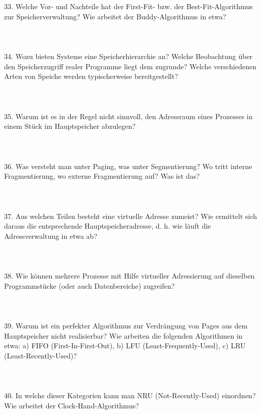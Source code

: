 \documentclass{article}
\begin{document}
\\
\\
33. Welche Vor- und Nachteile hat der First-Fit- bzw. der Best-Fit-Algorithmus zur Speicherverwaltung? Wie arbeitet der Buddy-Algorithmus in etwa?
\\
\\
\\
\\
34. Wozu bieten Systeme eine Speicherhierarchie an? Welche Beobachtung über den Speicherzugriff realer Programme liegt dem zugrunde? Welche verschiedenen Arten von Speiche
werden typischerweise bereitgestellt?
\\
\\
\\
\\
35. Warum ist es in der Regel nicht sinnvoll, den Adressraum eines Prozesses in einem Stück
im Hauptspeicher abzulegen?
\\
\\
\\
\\
36. Was versteht man unter Paging, was unter Segmentierung? Wo tritt interne Fragmentierung,
wo externe Fragmentierung auf? Was ist das?
\\
\\
\\
\\
37. Aus welchen Teilen besteht eine virtuelle Adresse zumeist? Wie ermittelt sich daraus die
entsprechende Hauptspeicheradresse, d. h. wie läuft die Adressverwaltung in etwa ab?
\\
\\
\\
\\
38. Wie können mehrere Prozesse mit Hilfe virtueller Adressierung auf dieselben Programmstücke (oder auch Datenbereiche) zugreifen?
\\
\\
\\
\\
39. Warum ist ein perfekter Algorithmus zur Verdrängung von Pages aus dem Hauptspeicher
nicht realisierbar? Wie arbeiten die folgenden Algorithmen in etwa:
a) FIFO (First-In-First-Out),
b) LFU (Least-Frequently-Used),
c) LRU (Least-Recently-Used)?
\\
\\
\\
\\
40. In welche dieser Kategorien kann man NRU (Not-Recently-Used) einordnen? Wie arbeitet
der Clock-Hand-Algorithmus?
\\
\end{document}
